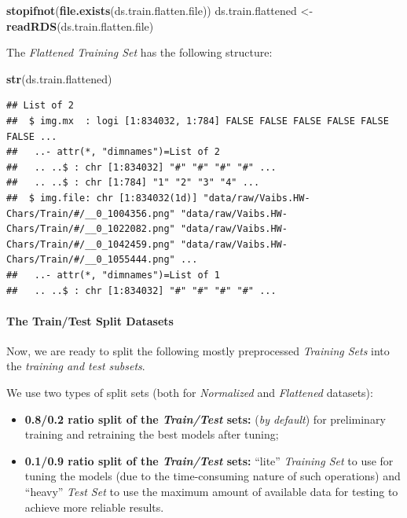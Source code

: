 \documentclass[
]{report}
\newenvironment{Shaded}{\begin{snugshade}}{\end{snugshade}}
\newcommand{\FunctionTok}[1]{\textcolor[rgb]{0.13,0.29,0.53}{\textbf{#1}}}
\newcommand{\NormalTok}[1]{#1}
\newcommand{\OtherTok}[1]{\textcolor[rgb]{0.56,0.35,0.01}{#1}}
\providecommand{\tightlist}{%
  \setlength{\itemsep}{0pt}\setlength{\parskip}{0pt}}
\begin{document}
\begin{Shaded}
\begin{Highlighting}[]
\FunctionTok{stopifnot}\NormalTok{(}\FunctionTok{file.exists}\NormalTok{(ds.train.flatten.file))}
\NormalTok{ds.train.flattened }\OtherTok{\textless{}{-}} \FunctionTok{readRDS}\NormalTok{(ds.train.flatten.file)}
\end{Highlighting}
\end{Shaded}

\newpage

The \emph{Flattened Training Set} has the following structure:

\begin{Shaded}
\begin{Highlighting}[]
\FunctionTok{str}\NormalTok{(ds.train.flattened)}
\end{Highlighting}
\end{Shaded}

\begin{verbatim}
## List of 2
##  $ img.mx  : logi [1:834032, 1:784] FALSE FALSE FALSE FALSE FALSE FALSE ...
##   ..- attr(*, "dimnames")=List of 2
##   .. ..$ : chr [1:834032] "#" "#" "#" "#" ...
##   .. ..$ : chr [1:784] "1" "2" "3" "4" ...
##  $ img.file: chr [1:834032(1d)] "data/raw/Vaibs.HW-Chars/Train/#/__0_1004356.png" "data/raw/Vaibs.HW-Chars/Train/#/__0_1022082.png" "data/raw/Vaibs.HW-Chars/Train/#/__0_1042459.png" "data/raw/Vaibs.HW-Chars/Train/#/__0_1055444.png" ...
##   ..- attr(*, "dimnames")=List of 1
##   .. ..$ : chr [1:834032] "#" "#" "#" "#" ...
\end{verbatim}

\paragraph{The Train/Test Split Datasets}\label{the-traintest-split-datasets}

\hfill\break

Now, we are ready to split the following mostly preprocessed \emph{Training Sets} into the \emph{training and test subsets}.

We use two types of split sets (both for \emph{Normalized} and \emph{Flattened} datasets):

\begin{itemize}
\tightlist
\item
  \textbf{0.8/0.2 ratio split of the \emph{Train/Test} sets:} (\emph{by default}) for preliminary training and retraining the best models after tuning;\\
\item
  \textbf{0.1/0.9 ratio split of the \emph{Train/Test} sets:} ``lite'' \emph{Training Set} to use for tuning the models (due to the time-consuming nature of such operations) and ``heavy'' \emph{Test Set} to use the maximum amount of available data for testing to achieve more reliable results.
\end{itemize}
\end{document}
